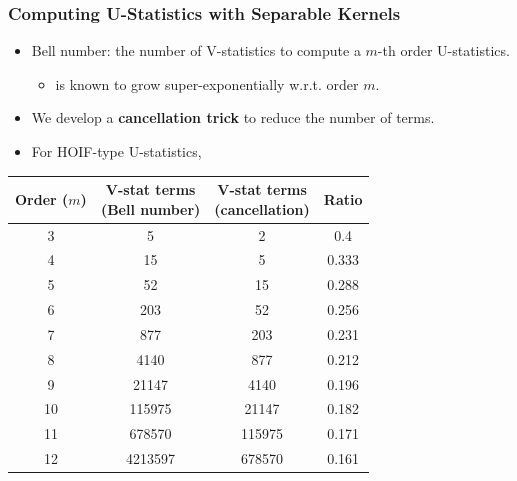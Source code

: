 \documentclass[9pt]{beamer}
\theoremstyle{mystyle}
\theoremstyle{mystyletwo}
\begin{document}
\begin{frame}
\frametitle{Computing U-Statistics with Separable Kernels}
\begin{itemize}
    \item Bell number: the number of V-statistics to compute a $m$-th order U-statistics. 
    \begin{itemize}
        \item is known to grow super-exponentially w.r.t. order $m$. 
    \end{itemize}
    \item We develop a {\bf cancellation trick} to reduce the number of terms. 
    \item For HOIF-type U-statistics, 
\end{itemize}
\begin{table}[h!]
\centering
\begin{tabular}{cccc}
\toprule
\textbf{Order ($m$)} & \makecell{\textbf{V-stat terms} \\ \textbf{(Bell number)}} & \makecell{\textbf{V-stat terms} \\ \textbf{(cancellation)}} & \textbf{Ratio} \\
\midrule
3  & 5       & 2       & 0.4 \\
4  & 15      & 5       & 0.333 \\
5  & 52      & 15      & 0.288 \\
6  & 203     & 52      & 0.256 \\
7  & 877     & 203     & 0.231 \\
8  & 4140    & 877     & 0.212 \\
9  & 21147   & 4140    & 0.196 \\
10 & 115975  & 21147   & 0.182 \\
11 & 678570  & 115975  & 0.171 \\
12 & 4213597 & 678570  & 0.161 \\
\bottomrule
\end{tabular}
\end{table}   
\end{frame}
\end{document}
